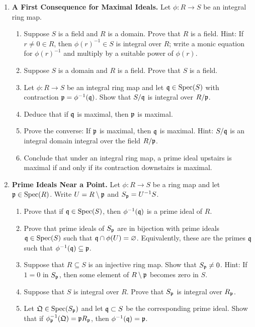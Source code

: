 \documentclass[12pt,reqno]{amsart}
\begin{document}
\begin{enumerate}[leftmargin=*, series=problems]

\item \textbf{A First Consequence for Maximal Ideals.} Let $\phi:R \to S$ be an integral ring map.
\begin{enumerate}
    \item Suppose $S$ is a field and $R$ is a domain. Prove that $R$ is a field. Hint: If $r \neq 0 \in R$, then $\phi(r)^{-1}\in S$ is integral over $R$; write a monic equation for $\phi(r)^{-1}$ and multiply by a suitable power of $\phi(r)$.
    \item Suppose $S$ is a domain and $R$ is a field. Prove that $S$ is a field.
    \item Let $\phi:R\to S$ be an integral ring map and let $\mathfrak{q}\in\operatorname{Spec}(S)$ with contraction $\mathfrak{p}=\phi^{-1}(\mathfrak{q})$. Show that $S/\mathfrak{q}$ is integral over $R/\mathfrak{p}$.
    \item Deduce that if $\mathfrak{q}$ is maximal, then $\mathfrak{p}$ is maximal.
    \item Prove the converse: If $\mathfrak{p}$ is maximal, then $\mathfrak{q}$ is maximal. Hint: $S/\mathfrak{q}$ is an integral domain integral over the field $R/\mathfrak{p}$.
    \item Conclude that under an integral ring map, a prime ideal upstairs is maximal if and only if its contraction downstairs is maximal.
\end{enumerate}

\item \textbf{Prime Ideals Near a Point.} Let $\phi:R\to S$ be a ring map and let $\mathfrak{p}\in\operatorname{Spec}(R)$. Write $U=R\setminus \mathfrak{p}$ and $S_{\mathfrak{p}}=U^{-1}S$.
\begin{enumerate}
    \item Prove that if $\mathfrak{q}\in\operatorname{Spec}(S)$, then $\phi^{-1}(\mathfrak{q})$ is a prime ideal of $R$.
    \item Prove that prime ideals of $S_{\mathfrak{p}}$ are in bijection with prime ideals $\mathfrak{q}\in\operatorname{Spec}(S)$ such that $\mathfrak{q}\cap \phi(U)=\varnothing$. Equivalently, these are the primes $\mathfrak{q}$ such that $\phi^{-1}(\mathfrak{q})\subseteq \mathfrak{p}$.
    \item Suppose that $R\subseteq S$ is an injective ring map. Show that $S_{\mathfrak{p}}\neq 0$. Hint: If $1=0$ in $S_{\mathfrak{p}}$, then some element of $R\setminus \mathfrak{p}$ becomes zero in $S$.
    \item Suppose that $S$ is integral over $R$. Prove that $S_{\mathfrak{p}}$ is integral over $R_{\mathfrak{p}}$.
    \item Let $\mathfrak Q\in\operatorname{Spec}(S_{\mathfrak{p}})$ and let $\mathfrak{q}\subset S$ be the corresponding prime ideal. Show that if $\phi^{-1}_{\mathfrak{p}}(\mathfrak Q)=\mathfrak{p} R_{\mathfrak{p}}$, then $\phi^{-1}(\mathfrak{q})=\mathfrak{p}$.
\end{enumerate}


\end{enumerate}
\end{document}
